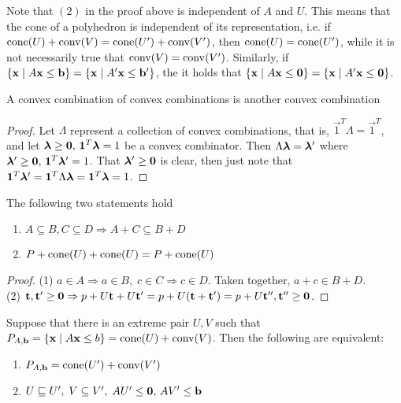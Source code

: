 \begin{Remark}\label{characteristic_cone}  Note that $(2)$ in the proof above is independent of $A$ and $U$.  This means that the cone of a polyhedron is independent of its representation, i.e. if $\operatorname{cone}(U) + \operatorname{conv}(V) = \operatorname{cone}(U') + \operatorname{conv}(V')$, then $\operatorname{cone}(U) = \operatorname{cone}(U')$, while it is not necessarily true that $\operatorname{conv}(V) = \operatorname{conv}(V')$.  Similarly, if $\left\{\mathbf{x}\;|\; A\mathbf{x}\leq \mathbf{b}\right\} = \left\{\mathbf{x}\;|\; A'\mathbf{x}\leq \mathbf{b}'\right\}$, the it holds that $\left\{\mathbf{x}\;|\; A\mathbf{x}\leq\mathbf{0}\right\} = \left\{\mathbf{x}\;|\; A'\mathbf{x}\leq\mathbf{0}\right\}$.
\end{Remark}

\begin{Prop}\label{conv_conv}
	A convex combination of convex combinations is another convex combination
\end{Prop}
\begin{proof}
	Let $\Lambda$ represent a collection of convex combinations, that is, $\vec{1}^T\Lambda = \vec{1}^T$, and let $\bm{\lambda}\geq\mathbf{0},\,\mathbf{1}^T\bm{\lambda} = 1$ be a convex combinator.  Then $\Lambda\bm{\lambda} = \bm{\lambda}'$ where $\bm{\lambda}'\geq\mathbf{0},\,\mathbf{1}^T\bm{\lambda}'=1$.  That $\bm{\lambda}'\geq\mathbf{0}$ is clear, then just note that $\mathbf{1}^T\bm{\lambda}' = \mathbf{1}^T\Lambda\bm{\lambda} = \mathbf{1}^T\bm{\lambda} = 1$.
\end{proof}

\begin{Prop}\label{minkowski_formula}
	The following two statements hold
	\begin{enumerate}
		\item $A \subseteq B, C\subseteq D \Rightarrow A + C \subseteq B + D$
		\item $P + \operatorname{cone}(U) + \operatorname{cone}(U) = P + \operatorname{cone}(U)$
	\end{enumerate}
\end{Prop}

\begin{proof}
	(1) $a\in A \Rightarrow a\in B,\; c\in C\Rightarrow c\in D$.  Taken together, $a+c \in B+D$.\\
	(2) $\mathbf{t},\mathbf{t}'\geq\mathbf{0} \Rightarrow p + U\mathbf{t} + U\mathbf{t}' = p + U(\mathbf{t}+\mathbf{t}') = p + U\mathbf{t}'', \mathbf{t}''\geq\mathbf{0}$.
\end{proof}

\begin{EqCriteria}\label{eq_hp_vp}
	Suppose that there is an extreme pair $U,V$ such that $P_{A,\mathbf{b}} = \left\{\mathbf{x}\;|\; A\mathbf{x}\leq b\right\} = \operatorname{cone}(U) + \operatorname{conv}(V)$.  Then the following are equivalent:
	\begin{enumerate}
		\item $P_{A,\mathbf{b}} = \operatorname{cone}(U') + \operatorname{conv}(V')$
		\item $U \sqsubseteq U',\; V \subseteq V',\; AU'\leq\mathbf{0},\, AV'\leq\mathbf{b}$
	\end{enumerate}
\end{EqCriteria}


